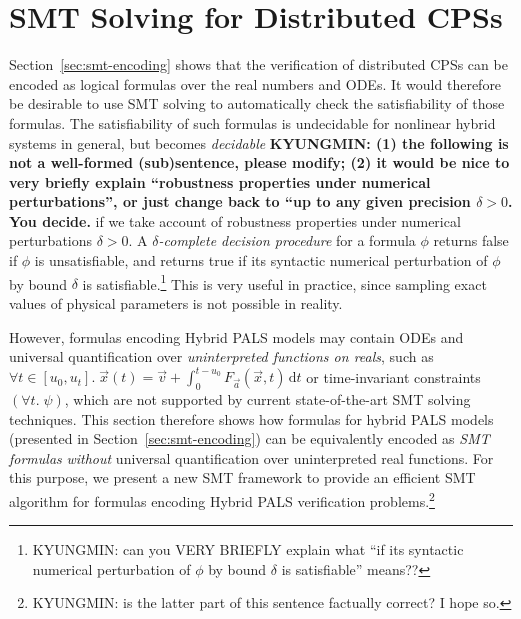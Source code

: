 

\section{SMT Solving for Distributed CPSs}
\label{sec:smt-logic}

Section~\ref{sec:smt-encoding} shows that  the verification of
distributed CPSs 
can be encoded as logical formulas over the real numbers and ODEs. 
It would therefore be desirable to use SMT solving to automatically
check the satisfiability of those formulas. 
%
The satisfiability of such  formulas is undecidable for nonlinear hybrid systems  in general,
but becomes \emph{decidable} %
\textbf{KYUNGMIN: (1) the following is not a well-formed
  (sub)sentence, please modify; (2) it would be nice to very briefly
  explain ``robustness properties under numerical perturbations'', or
  just change back to ``up to any given precision $\delta >0$. You decide.}
if we take account of robustness properties %
under numerical perturbations $\delta > 0$.
%
A \emph{$\delta$-complete decision procedure} for a formula $\phi$ returns false 
if $\phi$ is unsatisfiable, and returns true if its syntactic 
numerical perturbation of $\phi$ by bound $\delta$ is
satisfiable.\footnote{KYUNGMIN: can you VERY BRIEFLY explain what ``if its syntactic 
numerical perturbation of $\phi$ by bound $\delta$ is
satisfiable'' means??} 
This is  very useful in practice, since 
sampling exact values of physical parameters is not possible in reality. 

However, formulas encoding Hybrid PALS models
may contain ODEs and universal quantification over \emph{uninterpreted
  functions on reals},
such as 
$\forall t \in [u_0,u_t].\;
\vec{x}(t) = \vec{v} + \int_0^{t-u_0} \!  F_{\vec{a}}(\vec{x},t)\,\mathrm{d}t$
or time-invariant constraints $(\forall t.\; \psi)$,
which are not supported by current state-of-the-art SMT solving techniques.
%
%
This section therefore shows how formulas for hybrid PALS models (presented in Section~\ref{sec:smt-encoding})
can be equivalently encoded as \emph{SMT formulas}
\emph{without}  universal quantification over uninterpreted real functions.
For this purpose, we present a new  SMT framework to provide 
an efficient SMT algorithm
for  formulas encoding Hybrid PALS verification
problems.\footnote{KYUNGMIN: is the latter part of this sentence
  factually correct? I hope so.}

